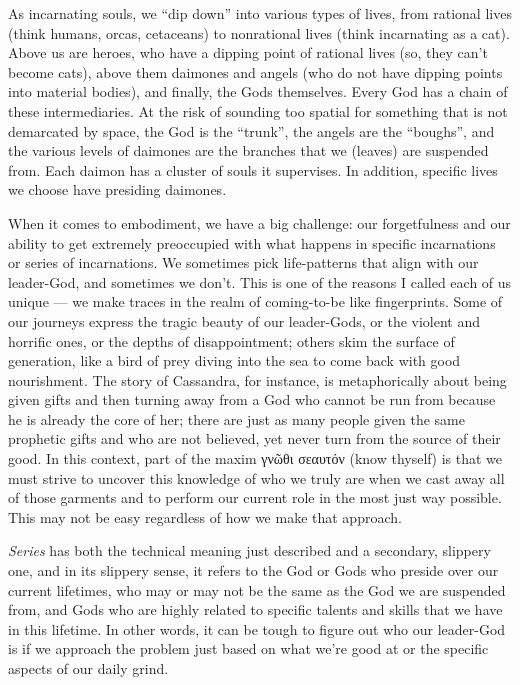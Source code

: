 \documentclass[
]{book}
\begin{document}
As incarnating souls, we ``dip down'' into various types of lives, from rational lives (think humans, orcas, cetaceans) to nonrational lives (think incarnating as a cat). Above us are heroes, who have a dipping point of rational lives (so, they can't become cats), above them daimones and angels (who do not have dipping points into material bodies), and finally, the Gods themselves. Every God has a chain of these intermediaries. At the risk of sounding too spatial for something that is not demarcated by space, the God is the ``trunk'', the angels are the ``boughs'', and the various levels of daimones are the branches that we (leaves) are suspended from. Each daimon has a cluster of souls it supervises. In addition, specific lives we choose have presiding daimones.

When it comes to embodiment, we have a big challenge: our forgetfulness and our ability to get extremely preoccupied with what happens in specific incarnations or series of incarnations. We sometimes pick life-patterns that align with our leader-God, and sometimes we don't. This is one of the reasons I called each of us unique --- we make traces in the realm of coming-to-be like fingerprints. Some of our journeys express the tragic beauty of our leader-Gods, or the violent and horrific ones, or the depths of disappointment; others skim the surface of generation, like a bird of prey diving into the sea to come back with good nourishment. The story of Cassandra, for instance, is metaphorically about being given gifts and then turning away from a God who cannot be run from because he is already the core of her; there are just as many people given the same prophetic gifts and who are not believed, yet never turn from the source of their good. In this context, part of the maxim γνῶθι σεαυτόν (know thyself) is that we must strive to uncover this knowledge of who we truly are when we cast away all of those garments and to perform our current role in the most just way possible. This may not be easy regardless of how we make that approach.

\emph{Series} has both the technical meaning just described and a secondary, slippery one, and in its slippery sense, it refers to the God or Gods who preside over our current lifetimes, who may or may not be the same as the God we are suspended from, and Gods who are highly related to specific talents and skills that we have in this lifetime. In other words, it can be tough to figure out who our leader-God is if we approach the problem just based on what we're good at or the specific aspects of our daily grind.
\end{document}
